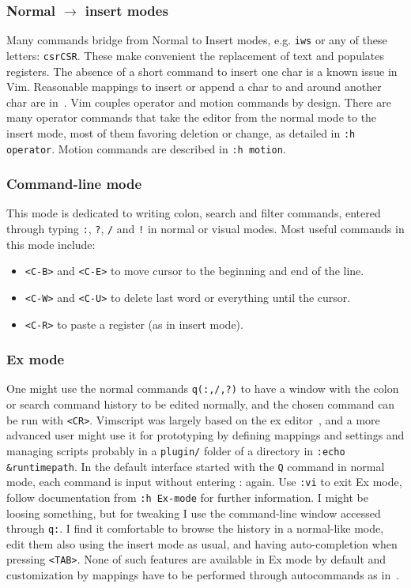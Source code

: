 \documentclass{article}
\newcommand{\ttt}[1] {
	\texttt{<#1>}}
\newcommand{\tttt}[1]{\texttt{#1}}
\begin{document}
\subsubsection{Normal $\rightarrow$ insert modes}\label{navIn}
Many commands bridge from Normal to Insert modes,
e.g. \tttt{iws} or any of these letters: \tttt{csrCSR}.
These make convenient the replacement of text and populates registers.
The absence of a short command to insert one char is
a known issue in Vim.
Reasonable mappings to insert or append a char to and around
another char are in~\cite{vimrc}.
Vim couples operator and motion commands by design.
There are many operator commands that take the editor from
the normal mode to the insert mode, most of them
favoring deletion or change, as detailed in \tttt{:h operator}.
Motion commands are described in \tttt{:h motion}.

\subsubsection{Command-line mode}\label{sec:com}
This mode is dedicated to writing colon, search and filter commands,
entered through typing \tttt{:}, \tttt{?}, \tttt{/} and \tttt{!} in normal or visual modes.
Most useful commands in this mode include:
\begin{itemize}
  \item \ttt{C-B} and \ttt{C-E} to move cursor to the beginning and
    end of the line.
  \item \ttt{C-W} and \ttt{C-U} to delete last word or everything
    until the cursor.
  \item \ttt{C-R} to paste a register (as in insert mode).
\end{itemize}

\subsubsection{Ex mode}\label{sec:ex}
One might use the normal commands \tttt{q(:,/,?)} to have a window
with the colon or search command history to be edited normally,
and the chosen command can be run with \ttt{CR}.
Vimscript was largely based on the ex editor~\cite{ex},
and a more advanced user might use it for prototyping
by defining mappings and settings and managing scripts
probably in a \tttt{plugin/} folder of a directory in \tttt{:echo \&runtimepath}.
In the default interface started with the \tttt{Q} command in normal mode,
each command is input without entering : again. Use \tttt{:vi} to exit Ex mode,
follow documentation from \tttt{:h Ex-mode} for further information.
I might be loosing something, but for
tweaking I use the command-line window accessed through \tttt{q:}.
I find it comfortable to browse the history in a normal-like mode,
edit them also using the insert mode as usual,
and having auto-completion when pressing \ttt{TAB}.
None of such features are available in Ex mode by default
and
customization by mappings have to be performed through autocommands as in~\cite{vimrc}.
\end{document}
